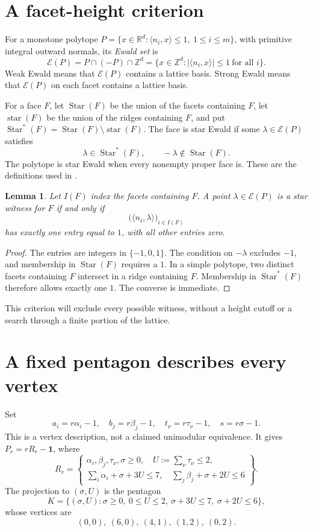 \documentclass[11pt]{article}
\newtheorem{lemma}[theorem]{Lemma}
\theoremstyle{remark}\newtheorem{remark}[theorem]{Remark}
\newcommand{\Z}{\mathbb Z}
\newcommand{\R}{\mathbb R}
\newcommand{\E}{\mathcal E}
\newcommand{\Star}{\operatorname{Star}}
\newcommand{\st}{\operatorname{star}}
\newcommand{\one}{\mathbf1}
\begin{document}
\section{A facet-height criterion}

For a monotone polytope
\(P=\{x\in\R^d:\langle n_i,x\rangle\le1,\ 1\le i\le m\}\),
with primitive integral outward normals, its \emph{Ewald set} is
\[
 \E(P)=P\cap(-P)\cap\Z^d
 =\{x\in\Z^d:|\langle n_i,x\rangle|\le1\ \text{for all }i\}.
\]
Weak Ewald means that \(\E(P)\) contains a lattice basis.
Strong Ewald means that \(\E(P)\) on each facet contains a lattice basis.

For a face \(F\), let \(\Star(F)\) be the union of the facets containing
\(F\), let \(\st(F)\) be the union of the ridges containing \(F\), and
put \(\Star^*(F)=\Star(F)\setminus\st(F)\).
The face is star Ewald if some \(\lambda\in\E(P)\) satisfies
\[
       \lambda\in\Star^*(F),\qquad-\lambda\notin\Star(F).
\]
The polytope is star Ewald when every nonempty proper face is.
These are the definitions used in \cite{Tu24,CPS26}.

\begin{lemma}\label{lem:star}
Let \(I(F)\) index the facets containing \(F\).
A point \(\lambda\in\E(P)\) is a star witness for \(F\) if and only if
\[
       \big(\langle n_i,\lambda\rangle\big)_{i\in I(F)}
\]
has exactly one entry equal to \(1\), with all other entries zero.
\end{lemma}
\begin{proof}
The entries are integers in \(\{-1,0,1\}\).
The condition on \(-\lambda\) excludes \(-1\), and membership in
\(\Star(F)\) requires a \(1\).
In a simple polytope, two distinct facets containing \(F\) intersect
in a ridge containing \(F\). Membership in \(\Star^*(F)\) therefore
allows exactly one \(1\). The converse is immediate.
\end{proof}
This criterion will exclude every possible witness, without a height
cutoff or a search through a finite portion of the lattice.

\section{A fixed pentagon describes every vertex}

Set
\[
 a_i=r\alpha_i-1,\quad b_j=r\beta_j-1,\quad
 t_\nu=r\tau_\nu-1,\quad s=r\sigma-1.
\]
This is a vertex description, not a claimed unimodular equivalence.
It gives \(P_r=rR_r-\one\), where
\begin{equation}\label{eq:rescaled}
 R_r=\left\{\begin{array}{l}
 \alpha_i,\beta_j,\tau_\nu,\sigma\ge0,\quad U:=\sum_\nu\tau_\nu\le2,\\
 \sum_i\alpha_i+\sigma+3U\le7,\quad
 \sum_j\beta_j+\sigma+2U\le6
 \end{array}\right\}.
\end{equation}
The projection to \((\sigma,U)\) is the pentagon
\[
 K=\{(\sigma,U):\sigma\ge0,\ 0\le U\le2,\
                 \sigma+3U\le7,\ \sigma+2U\le6\},
\]
whose vertices are
\[
              (0,0),\ (6,0),\ (4,1),\ (1,2),\ (0,2).
\]
\end{document}
